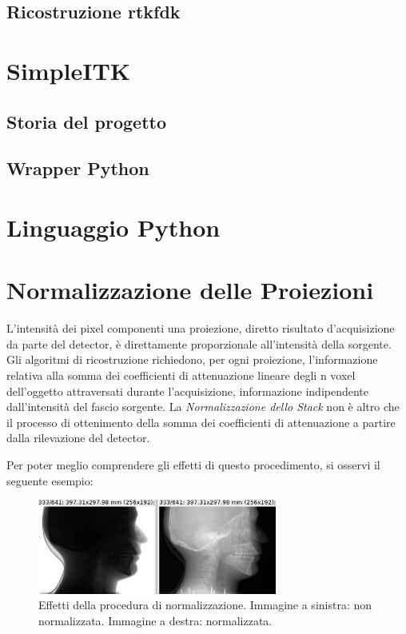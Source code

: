 \documentclass[a4paper,12pt, doubleside]{report}
\begin{document}
            \subsection{Ricostruzione rtkfdk}

        \section{SimpleITK}
            \subsection{Storia del progetto}
            \subsection{Wrapper Python}
                
        \section{Linguaggio Python}
            
        \section{Normalizzazione delle Proiezioni}
            \label{sec:normalizzation}
            \par
                L'intensità dei pixel componenti una proiezione, diretto risultato d'acquisizione da parte del detector, è direttamente proporzionale all'intensità della sorgente. Gli algoritmi di ricostruzione richiedono, per ogni proiezione, l'informazione relativa alla somma dei coefficienti di attenuazione lineare degli n voxel dell'oggetto attraversati durante l'acquisizione, informazione indipendente dall'intensità del fascio sorgente. La \textit{Normalizzazione dello Stack} non è altro che il processo di ottenimento della somma dei coefficienti di attenuazione a partire dalla rilevazione del detector.
            \par
                Per poter meglio comprendere gli effetti di questo procedimento, si osservi il seguente esempio:
                
                \begin{figure}[h]
                    \centering
                    \includegraphics[width=0.7\textwidth]{normalization}
                    \caption{Effetti della procedura di normalizzazione. Immagine a sinistra: non normalizzata. Immagine a destra: normalizzata.}
                    \label{fig:skull-phantom}
                \end{figure}
                
\end{document}
